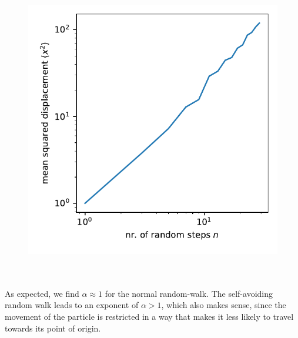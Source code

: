 \begin{figure}[h!]
\begin{minipage}{.5\linewidth}
{            \includegraphics[scale=.7]{./figures/MSD_vs_N_loglog_SA.pdf}
          }
        \end{minipage}
    \end{figure} \ \\
    \\
    As expected, we find $\alpha\approx1$ for the normal 
    random-walk. The self-avoiding random walk leads to an 
    exponent of $\alpha>1$, which also makes sense, since the 
    movement of the particle is restricted in a way that makes 
    it less likely to travel towards its point of origin.
